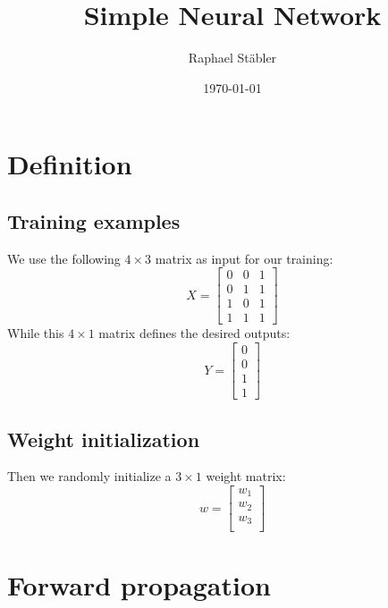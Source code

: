 \documentclass[10pt,a4paper]{article}
\author{Raphael St\"abler}
\title{Simple Neural Network}
\date{\today{}}
\begin{document}
\begin{titlepage}
	\maketitle
	\thispagestyle{empty}
\end{titlepage}

\newpage

\section{Definition}
\subsection{Training examples}
We use the following $4 \times 3$ matrix as input for our training:
\begin{equation}
	X =
	\begin{bmatrix}
		0 & 0 & 1 \\
		0 & 1 & 1 \\
		1 & 0 & 1 \\
		1 & 1 & 1
	\end{bmatrix}
\end{equation}	
While this $4 \times 1$ matrix defines the desired outputs:
\begin{equation}
	Y =
	\begin{bmatrix}
		0 \\
		0 \\
		1 \\
		1
	\end{bmatrix}
\end{equation}
\subsection{Weight initialization}
Then we randomly initialize a $3 \times 1$ weight matrix:
\begin{equation}
	w =
	\begin{bmatrix}
		w_1 \\
		w_2 \\
		w_3 \\
	\end{bmatrix}
\end{equation}

\section{Forward propagation}
\end{document}
